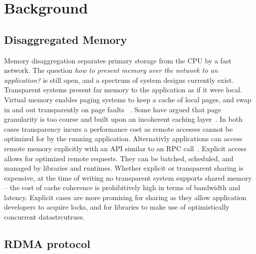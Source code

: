 \section{Background}

\subsection{Disaggregated Memory}

Memory disaggregation separates primary storage from the CPU
by a fast network. The question \textit{how to present
memory over the network to an application?} is still open,
and a spectrum of system designs currently exist.
Transparent systems present far memory to the application as
if it were local. Virtual memory enables paging systems to
keep a cache of local pages, and swap in and out
transparently on page faults ~\cite{infiniswap, leap,
fastswap}.  Some have argued that page granularity is too
course and built upon an incoherent caching
layer~\cite{kona, legoos}.  In both cases transparency
incurs a performance cost as remote accesses cannot be
optimized for by the running application.
Alternativly applications can access remote memory
explicitly with an API similar to an RPC
call~\cite{aifm,reigons,clover,sherman,faast}. Explicit
access allows for optimized remote requests. They can be
batched, scheduled, and managed by libraries and runtimes. 
Whether explicit or transparent sharing is expensive, at the
time of writing no transparent system supports shared memory
-- the cost of cache coherence is prohibitively high in
terms of bandwidth and latency. Explicit cases are more
promising for sharing as they allow application developers
to acquire locks, and for libraries to make use of
optimistically concurrent datastrcutrues.

\subsection{RDMA protocol}


